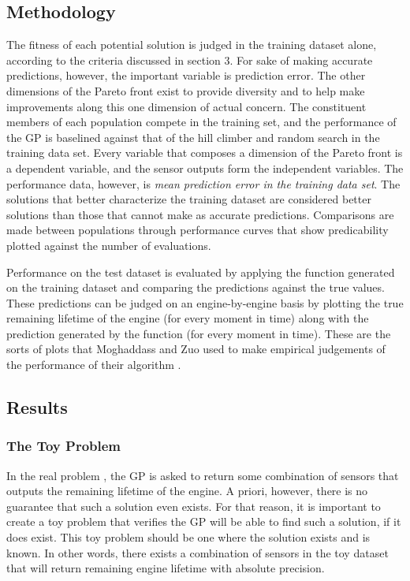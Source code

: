 \documentclass{acm_proc_article-sp}
\begin{document}
\subsection{Methodology}
The fitness of each potential solution is judged in the training dataset alone, according to the criteria discussed in section 3. For sake of making accurate predictions, however, the important variable is prediction error. The other dimensions of the Pareto front exist to provide diversity and to help make improvements along this one dimension of actual concern. The constituent members of each population compete in the training set, and the performance of the GP is baselined against that of the hill climber and random search in the training data set. Every variable that composes a dimension of the Pareto front is a dependent variable, and the sensor outputs form the independent variables. The performance data, however, is {\it{mean prediction error in the training data set}}. The solutions that better characterize the training dataset are considered better solutions than those that cannot make as accurate predictions. Comparisons are made between populations through performance curves that show predicability plotted against the number of evaluations.

Performance on the test dataset is evaluated by applying the function generated on the training dataset and comparing the predictions against the true values. These predictions can be judged on an engine-by-engine basis by plotting the true remaining lifetime of the engine (for every moment in time) along with the prediction generated by the function (for every moment in time). These are the sorts of plots that Moghaddass and Zuo used to make empirical judgements of the performance of their algorithm \cite{Mog}.

\subsection{Results}
\subsubsection{The Toy Problem}
In the real problem , the GP is asked to return some combination of sensors that outputs the remaining lifetime of the engine. A priori, however, there is no guarantee that such a solution even exists. For that reason, it is important to create a toy problem that verifies the GP will be able to find such a solution, if it does exist. This toy problem should be one where the solution exists and is known. In other words, there exists a combination of sensors in the toy dataset that will return remaining engine lifetime with absolute precision.
\end{document}

